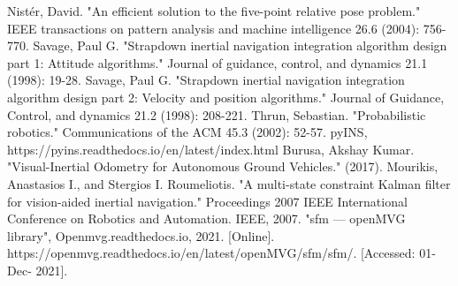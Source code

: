 \documentclass[conference]{IEEEtran}
\begin{document}
\begin{thebibliography}{00}
 Nistér, David. "An efficient solution to the five-point relative pose problem." IEEE transactions on pattern analysis and machine intelligence 26.6 (2004): 756-770.
 Savage, Paul G. "Strapdown inertial navigation integration algorithm design part 1: Attitude algorithms." Journal of guidance, control, and dynamics 21.1 (1998): 19-28.
 Savage, Paul G. "Strapdown inertial navigation integration algorithm design part 2: Velocity and position algorithms." Journal of Guidance, Control, and dynamics 21.2 (1998): 208-221.
 Thrun, Sebastian. "Probabilistic robotics." Communications of the ACM 45.3 (2002): 52-57.
 pyINS, https://pyins.readthedocs.io/en/latest/index.html
 Burusa, Akshay Kumar. "Visual-Inertial Odometry for Autonomous Ground Vehicles." (2017).
 Mourikis, Anastasios I., and Stergios I. Roumeliotis. "A multi-state constraint Kalman filter for vision-aided inertial navigation." Proceedings 2007 IEEE International Conference on Robotics and Automation. IEEE, 2007.
 "sfm — openMVG library", Openmvg.readthedocs.io, 2021. [Online]. https://openmvg.readthedocs.io/en/latest/openMVG/sfm/sfm/. [Accessed: 01- Dec- 2021].

\end{thebibliography}
\vspace{12pt}
\end{document}

